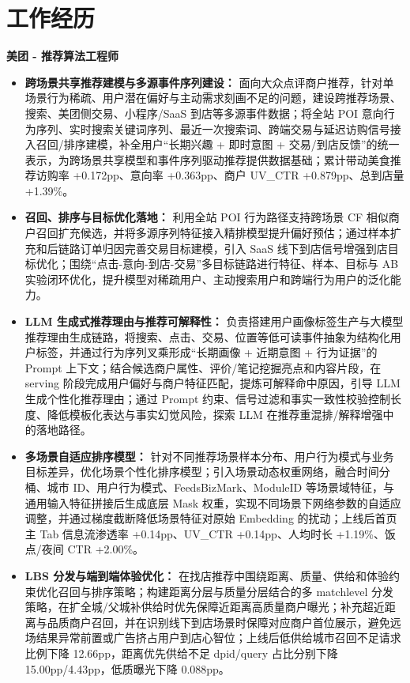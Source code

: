 \documentclass[fontset=none,a4paper,10pt]{ctexart}
\newcommand{\resumeItem}[2]{
  {
    {\fontsize{9.8pt}{10.2pt}\selectfont\textbf{#1}}{ #2 \vspace{0pt}}
  }
}
\newcommand{\resumeSubItem}[2]{\resumeItem{#1}{#2}\vspace{0pt}}
\begin{document}
\vspace{-1pt}
\section{工作经历}
\resumeSubItem{美团 - 推荐算法工程师}\hfill{2025.07 -- 至今}
\begin{itemize}[leftmargin=*, itemsep=3.6pt, topsep=4pt]
\item \textbf{跨场景共享推荐建模与多源事件序列建设：} 面向大众点评商户推荐，针对单场景行为稀疏、用户潜在偏好与主动需求刻画不足的问题，建设跨推荐场景、搜索、美团侧交易、小程序/SaaS 到店等多源事件数据；将全站 POI 意向行为序列、实时搜索关键词序列、最近一次搜索词、跨端交易与延迟访购信号接入召回/排序建模，补全用户“长期兴趣 + 即时意图 + 交易/到店反馈”的统一表示，为跨场景共享模型和事件序列驱动推荐提供数据基础；累计带动美食推荐访购率 +0.172pp、意向率 +0.363pp、商户 UV\_CTR +0.879pp、总到店量 +1.39\%。
\item \textbf{召回、排序与目标优化落地：} 利用全站 POI 行为路径支持跨场景 CF 相似商户召回扩充候选，并将多源序列特征接入精排模型提升偏好预估；通过样本扩充和后链路订单归因完善交易目标建模，引入 SaaS 线下到店信号增强到店目标优化；围绕“点击-意向-到店-交易”多目标链路进行特征、样本、目标与 AB 实验闭环优化，提升模型对稀疏用户、主动搜索用户和跨端行为用户的泛化能力。
\item \textbf{LLM 生成式推荐理由与推荐可解释性：} 负责搭建用户画像标签生产与大模型推荐理由生成链路，将搜索、点击、交易、位置等低可读事件抽象为结构化用户标签，并通过行为序列叉乘形成“长期画像 + 近期意图 + 行为证据”的 Prompt 上下文；结合候选商户属性、评价/笔记挖掘亮点和内容片段，在 serving 阶段完成用户偏好与商户特征匹配，提炼可解释命中原因，引导 LLM 生成个性化推荐理由；通过 Prompt 约束、信号过滤和事实一致性校验控制长度、降低模板化表达与事实幻觉风险，探索 LLM 在推荐重混排/解释增强中的落地路径。
\item \textbf{多场景自适应排序模型：} 针对不同推荐场景样本分布、用户行为模式与业务目标差异，优化场景个性化排序模型；引入场景动态权重网络，融合时间分桶、城市 ID、用户行为模式、FeedsBizMark、ModuleID 等场景域特征，与通用输入特征拼接后生成底层 Mask 权重，实现不同场景下网络参数的自适应调整，并通过梯度截断降低场景特征对原始 Embedding 的扰动；上线后首页主 Tab 信息流渗透率 +0.14pp、UV\_CTR +0.14pp、人均时长 +1.19\%、饭点/夜间 CTR +2.00\%。
\item \textbf{LBS 分发与端到端体验优化：} 在找店推荐中围绕距离、质量、供给和体验约束优化召回与排序策略；构建距离分层与质量分层结合的多 matchlevel 分发策略，在扩全城/父城补供给时优先保障近距离高质量商户曝光；补充超近距离与品质商户召回，并在识别线下到店场景时保障对应商户首位展示，避免远场结果异常前置或广告挤占用户到店心智位；上线后低供给城市召回不足请求比例下降 12.66pp，距离优先供给不足 dpid/query 占比分别下降 15.00pp/4.43pp，低质曝光下降 0.088pp。
\end{itemize}
\end{document}
